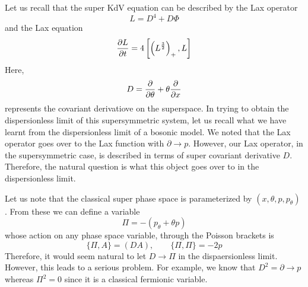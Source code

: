 \documentclass[a4paper,11pt]{article}
\begin{document}

Let us recall that the super KdV equation can be described by the Lax
operator
$$
L = D^{4} + D \Phi
$$
and the Lax equation
$$
{\partial L\over \partial t} = 4 \left[\left(L^{3\over 2}\right)_{+} ,
L\right]
$$
Here,
$$
D = {\partial\over \partial \theta} + \theta {\partial\over \partial
x}
$$ represents the covariant derivatiove on the superspace. In trying
to obtain the dispersionless limit of this supersymmetric system, let
us recall what we have learnt from the dispersionless limit of a
bosonic model. We noted that the Lax operator goes over to the Lax
function with $\partial \rightarrow p$. However, our Lax operator, in
the supersymmetric case, is described in terms of super covariant
derivative $D$. Therefore, the natural question is what this object
goes over to in the dispersionless limit.

Let us note that the classical super phase space is parameterized by
$(x,\theta,p,p_{\theta})$ . From these we can define a variable
\begin{equation}
\Pi = - (p_{\theta} + \theta p)
\end{equation}
whose action on any phase space variable, through the Poisson brackets
is
\begin{equation}
\{\Pi , A\} = (DA),\qquad \{\Pi , \Pi\} = -2p
\end{equation}
Therefore, it would seem natural to let $D\rightarrow \Pi$ in the
dispaersionless limit. However, this leads to a serious problem. For
example, we know that $D^{2} = \partial\rightarrow p$ whereas $\Pi^{2}
= 0$ since it is a classical fermionic variable.
\end{document}
